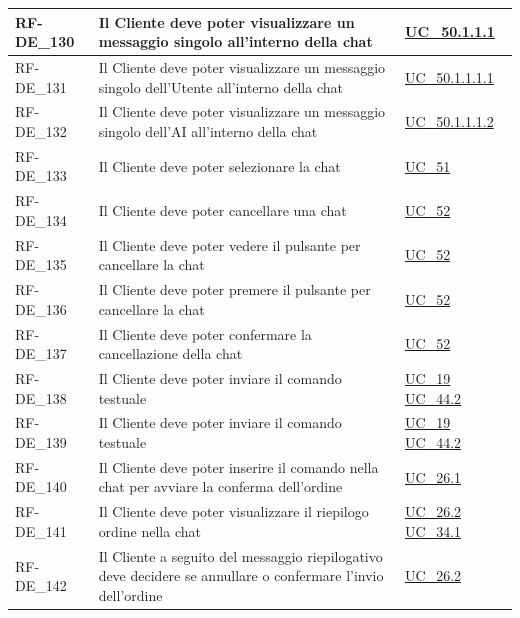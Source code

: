 \begin{longtable}{|>{\raggedright}p{}|>{\raggedright\arraybackslash}p{}|>{\raggedright\arraybackslash}p{}|}
	\hline
	RF-DE\_130 \hypertarget{rf-de_130} & Il Cliente deve poter visualizzare un messaggio singolo all'interno della chat & \hyperref[uc_50.1.1.1]{UC\_50.1.1.1} \\
	\hline
	RF-DE\_131 \hypertarget{rf-de_131} & Il Cliente deve poter visualizzare un messaggio singolo dell'Utente all'interno della chat & \hyperref[uc_50.1.1.1.1]{UC\_50.1.1.1.1} \\
	\hline
	RF-DE\_132 \hypertarget{rf-de_132} & Il Cliente deve poter visualizzare un messaggio singolo dell'AI all'interno della chat & \hyperref[uc_50.1.1.1.2]{UC\_50.1.1.1.2} \\
	\hline
	RF-DE\_133 \hypertarget{rf-de_133} & Il Cliente deve poter selezionare la chat & \hyperref[uc_51]{UC\_51} \\
	\hline
	RF-DE\_134 \hypertarget{rf-de_134} & Il Cliente deve poter cancellare una chat & \hyperref[uc_52]{UC\_52} \\
	\hline
	RF-DE\_135 \hypertarget{rf-de_135} & Il Cliente deve poter vedere il pulsante per cancellare la chat & \hyperref[uc_52]{UC\_52} \\
	\hline
	RF-DE\_136 \hypertarget{rf-de_136} & Il Cliente deve poter premere il pulsante per cancellare la chat & \hyperref[uc_52]{UC\_52} \\
	\hline
	RF-DE\_137 \hypertarget{rf-de_137} & Il Cliente deve poter confermare la cancellazione della chat & \hyperref[uc_52]{UC\_52} \\
	\hline
	RF-DE\_138 \hypertarget{rf-de_138} & Il Cliente deve poter inviare il comando testuale \vr{/carrello} & \hyperref[uc_19]{UC\_19} \newline \hyperref[uc_44.2]{UC\_44.2}  \\
	\hline
	RF-DE\_139 \hypertarget{rf-de_139} & Il Cliente deve poter inviare il comando testuale \vr{/carrello} & \hyperref[uc_19]{UC\_19} \newline \hyperref[uc_44.2]{UC\_44.2}  \\
	\hline
	RF-DE\_140 \hypertarget{rf-de_140} & Il Cliente deve poter inserire il comando \vr{/invia} nella chat per avviare la conferma dell'ordine & \hyperref[uc_26.1]{UC\_26.1} \\
	\hline
	RF-DE\_141 \hypertarget{rf-de_141} & Il Cliente deve poter visualizzare il riepilogo ordine nella chat & \hyperref[uc_26.2]{UC\_26.2} \newline \hyperref[uc_34.1]{UC\_34.1}\\
	\hline
	RF-DE\_142 \hypertarget{rf-de_142} & Il Cliente a seguito del messaggio riepilogativo deve decidere se annullare o confermare l'invio dell'ordine & \hyperref[uc_26.2]{UC\_26.2} \\

\end{longtable}
